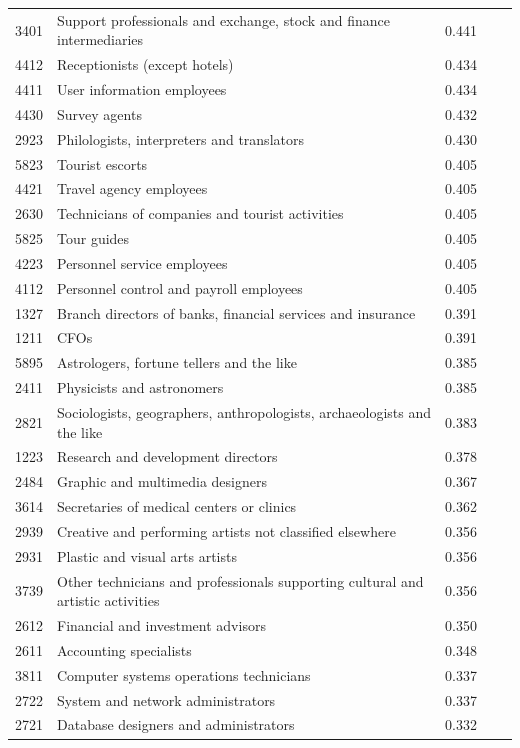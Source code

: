 \begin{longtable}{p{}>{\raggedright\arraybackslash}p{}rrr}
3401 & Support professionals and exchange, stock and finance intermediaries & 0.441 & & \\
4412 & Receptionists (except hotels) & 0.434 & & \\
4411 & User information employees & 0.434 & & \\
4430 & Survey agents & 0.432 & & \\
2923 & Philologists, interpreters and translators & 0.430 & & \\
5823 & Tourist escorts & 0.405 & & \\
4421 & Travel agency employees & 0.405 & & \\
2630 & Technicians of companies and tourist activities & 0.405 & & \\
5825 & Tour guides & 0.405 & & \\
4223 & Personnel service employees & 0.405 & & \\
4112 & Personnel control and payroll employees & 0.405 & & \\
1327 & Branch directors of banks, financial services and insurance & 0.391 & & \\
1211 & CFOs & 0.391 & & \\
5895 & Astrologers, fortune tellers and the like & 0.385 & & \\
2411 & Physicists and astronomers & 0.385 & & \\
2821 & Sociologists, geographers, anthropologists, archaeologists and the like & 0.383 & & \\
1223 & Research and development directors & 0.378 & & \\
2484 & Graphic and multimedia designers & 0.367 & & \\
3614 & Secretaries of medical centers or clinics & 0.362 & & \\
2939 & Creative and performing artists not classified elsewhere & 0.356 & & \\
2931 & Plastic and visual arts artists & 0.356 & & \\
3739 & Other technicians and professionals supporting cultural and artistic activities & 0.356 & & \\
2612 & Financial and investment advisors & 0.350 & & \\
2611 & Accounting specialists & 0.348 & & \\
3811 & Computer systems operations technicians & 0.337 & & \\
2722 & System and network administrators & 0.337 & & \\
2721 & Database designers and administrators & 0.332 & & \\

\end{longtable}
